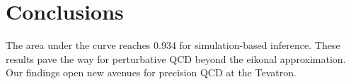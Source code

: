 \section{Conclusions}\label{sec:conclusions}

The area under the curve reaches 0.934 for simulation-based inference.
These results pave the way for perturbative QCD beyond the eikonal
approximation. Our findings open new avenues for precision QCD at the
Tevatron.

